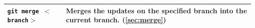 \begin{table}[H]
\begin{tabular}{|m{7em}|m{23em}|}
        \texttt{git merge $<$branch$>$} &
        Merges the updates on the specified branch into the current branch. (\cref{sec:merge})
        \\ \hline
        
        
        
        
    \end{tabular}
\end{table}
